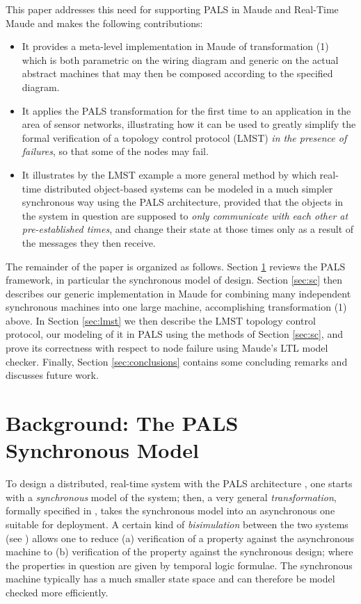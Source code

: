 \documentclass[copyright,creativecommons]{eptcs}
\begin{document}
This paper addresses this need for supporting PALS in Maude and Real-Time Maude
and makes the following contributions:
\begin{itemize}
\item It provides a meta-level  implementation in Maude of transformation (1)
which is both parametric on the wiring diagram and generic on the actual
abstract machines that may then be composed according to the specified diagram.

\item It applies the PALS transformation for the first time to an application
in the area of sensor networks, illustrating how it can be used to greatly
simplify the formal verification of  a topology control protocol (LMST)
\emph{in the presence of failures}, so that some of the nodes may fail.

\item It illustrates by the LMST example a more general method by which
real-time distributed object-based systems can be modeled in a much simpler
synchronous way using the PALS architecture, provided that the objects in the
system in question are supposed to \emph{only communicate with each other at
pre-established times}, and change their state at those times only as a result
of the messages they then receive.  
\end{itemize}

The remainder of the paper is organized as follows. Section \ref{sec:pals}
reviews the PALS framework, in particular the synchronous model of design.
Section \ref{sec:sc} then describes our generic implementation in Maude for
combining many independent synchronous machines into one large machine,
accomplishing transformation (1) above. In Section \ref{sec:lmst} we then
describe the LMST topology control protocol, our modeling of it in PALS using
the methods of Section \ref{sec:sc}, and prove its correctness with respect to
node failure using Maude's LTL model checker. Finally, Section
\ref{sec:conclusions} contains some concluding remarks and discusses future
work.

\section{Background: The PALS Synchronous Model}
\label{sec:pals}

To design a distributed, real-time system with the PALS architecture
\cite{meseguer_2010_01,meseguer_2009_01,sha_2009_01,miller_2009_01}, one starts with a
\emph{synchronous} model of the system; then, a very general
\emph{transformation}, formally specified in \cite{meseguer_2010_01,meseguer_2009_01}, takes the
synchronous model into an asynchronous one suitable for deployment. A
certain kind of \emph{bisimulation} between the two systems (see
\cite{meseguer_2010_01,meseguer_2009_01}) allows one to reduce (a) verification of a property
against the asynchronous machine to (b) verification of the property against
the synchronous design; where the properties in question are given by temporal
logic formulae. The synchronous machine typically has a much smaller state
space and can therefore be model checked more efficiently.
\end{document}
